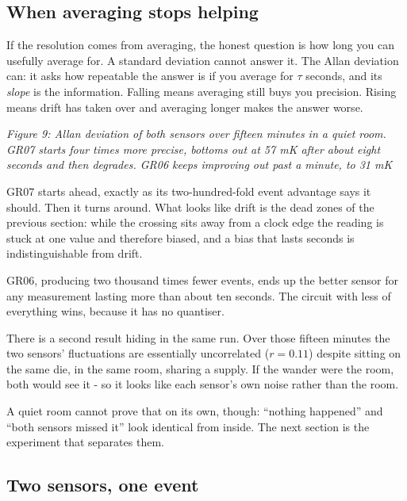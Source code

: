 \subsection{When averaging stops
helping}\label{when-averaging-stops-helping}

If the resolution comes from averaging, the honest question is how long
you can usefully average for. A standard deviation cannot answer it. The
Allan deviation can: it asks how repeatable the answer is if you average
for \(\tau\) seconds, and its \emph{slope} is the information. Falling
means averaging still buys you precision. Rising means drift has taken
over and averaging longer makes the answer worse.


{
\centering
{}
}

\emph{Figure 9: Allan deviation of both sensors over fifteen minutes in
a quiet room. GR07 starts four times more precise, bottoms out at 57 mK
after about eight seconds and then degrades. GR06 keeps improving out
past a minute, to 31 mK}

GR07 starts ahead, exactly as its two-hundred-fold event advantage says
it should. Then it turns around. What looks like drift is the dead zones
of the previous section: while the crossing sits away from a clock edge
the reading is stuck at one value and therefore biased, and a bias that
lasts seconds is indistinguishable from drift.

GR06, producing two thousand times fewer events, ends up the better
sensor for any measurement lasting more than about ten seconds. The
circuit with less of everything wins, because it has no quantiser.

There is a second result hiding in the same run. Over those fifteen
minutes the two sensors' fluctuations are essentially uncorrelated
(\(r = 0.11\)) despite sitting on the same die, in the same room,
sharing a supply. If the wander were the room, both would see it - so it
looks like each sensor's own noise rather than the room.

A quiet room cannot prove that on its own, though: ``nothing happened''
and ``both sensors missed it'' look identical from inside. The next
section is the experiment that separates them.

\subsection{Two sensors, one event}\label{two-sensors-one-event}

